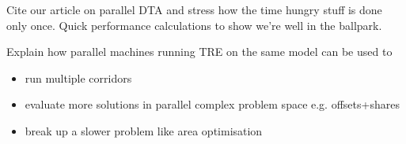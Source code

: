 Cite our article on parallel DTA and stress how the time hungry stuff is done only once.
Quick performance calculations to show we're well in the ballpark.

Explain how parallel machines running TRE on the same model can be used to
\begin{itemize}
\item run multiple corridors
\item evaluate more solutions in parallel complex problem space e.g. offsets+shares
\item break up a slower problem like area optimisation
\end{itemize}

